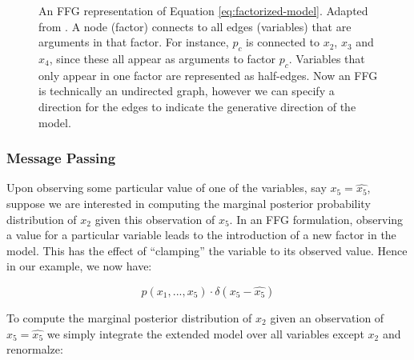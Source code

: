 \documentclass[onecolumn]{IEEEtran}
\begin{document}
\begin{figure}[htbp]
  \centering
  \caption{An FFG representation of Equation \ref{eq:factorized-model}. Adapted from \textcite{Factor-Graph-Approach-Automated-Design-Bayesian-Algos}. A node (factor) connects to all edges (variables) that are arguments in that factor. For instance, $p_c$ is connected to $x_2$, $x_3$ and $x_4$, since these all appear as arguments to factor $p_c$. Variables that only appear in one factor are represented as half-edges. Now an FFG is technically an undirected graph, however we can specify a direction for the edges to indicate the generative direction of the model.}
  \label{fig:factor-graph}
\end{figure}


\vspace{12pt}
\subsubsection{Message Passing}

Upon observing some particular value of one of the variables, say $x_5 = \hat{x_5}$, suppose we are interested in computing the marginal posterior probability distribution of $x_2$ given this observation of $x_5$. In an FFG formulation, observing a value for a particular variable leads to the introduction of a new factor in the model. This has the effect of ``clamping'' the variable to its observed value. Hence in our example, we now have:

$$ p(x_1, ..., x_5) \cdot \delta(x_5 - \hat{x_5})$$ 

To compute the marginal posterior distribution of $x_2$ given an observation of $x_5 = \hat{x_5}$ we simply integrate the extended model over all variables except $x_2$ and renormalze:
\end{document}
